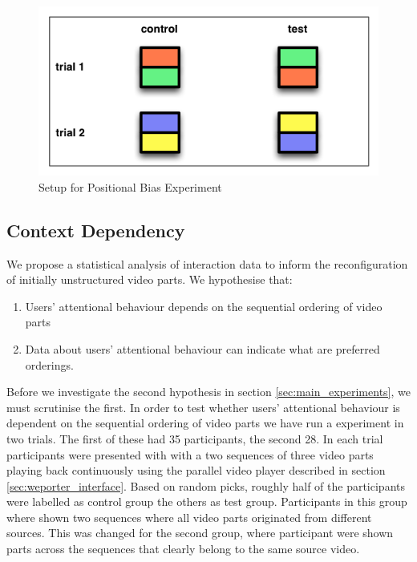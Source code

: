 \begin{figure}[htbp]
  \centering
    \includegraphics[width = .7\textwidth]{img/exp_posbias}
  \caption{Setup for Positional Bias Experiment}
  \label{fig:exp_posbias}
\end{figure}


\subsection{Context Dependency}
We propose a statistical analysis of interaction data to inform the reconfiguration of initially unstructured video parts. We hypothesise that:
\begin{enumerate}
  \item Users' attentional behaviour depends on the sequential ordering of video parts
  \item Data about users' attentional behaviour can indicate what are preferred orderings.
\end{enumerate}

Before we investigate the second hypothesis in section \ref{sec:main_experiments}, we must scrutinise the first. In order to test whether users' attentional behaviour is dependent on the sequential ordering of video parts we have run a experiment in two trials. The first of these had 35 participants, the second 28. In each trial participants were presented with with a two sequences of three video parts playing back continuously using the parallel video player described in section \ref{sec:weporter_interface}. Based on random picks, roughly half of the participants were labelled as control group the others as test group. Participants in this group where shown two sequences where all video parts originated from different sources. This was changed for the second group, where participant were shown parts across the sequences that clearly belong to the same source video. 

